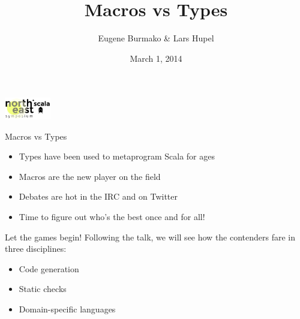 \documentclass[compress,xcolor={usenames,dvipsnames,table}]{beamer}
\begin{document}
  \title{Macros vs Types}
  \author{Eugene Burmako \& Lars Hupel}
  \date{March 1, 2014}

{
\begin{frame}
  \titlepage

  \begin{center}
    \includegraphics[width=2cm]{img/nescala-logo.png}
  \end{center}
\end{frame}
}

\begin{frame}{Macros vs Types}
  \begin{itemize}
    \item Types have been used to metaprogram Scala for ages
    \item Macros are the new player on the field
    \item Debates are hot in the IRC and on Twitter
    \item Time to figure out who's the best once and for all!
  \end{itemize}
\end{frame}

\begin{frame}{Let the games begin!}
  Following the  talk, we will see how the contenders fare in three disciplines:

  \vspace{1em}
  \begin{itemize}
    \item Code generation
    \item Static checks
    \item Domain-specific languages
  \end{itemize}
\end{frame}

\end{document}
